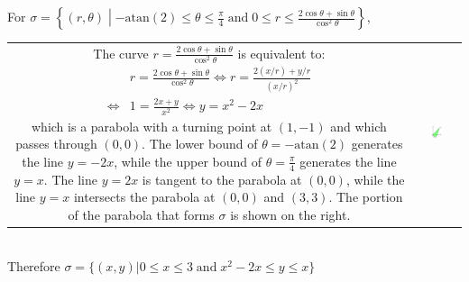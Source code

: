\documentclass{article}
\newcommand{\atan}{\text{atan}}
\newcommand{\dr}[1]{\textcolor{dark_red}{#1}}
\begin{document}
\dr{\begin{framed}
For \(\sigma = \left\{(r,\theta) \middle| -\atan(2) \leq \theta \leq \frac{\pi}{4} \;\text{and}\; 0 \leq r \leq \frac{2\cos\theta + \sin\theta}{\cos^2\theta}\right\}\), \\
\begin{tabular}{cc}
\parbox{0.6\textwidth}{
The curve \(r = \frac{2\cos\theta + \sin\theta}{\cos^2\theta}\) is equivalent to:
\begin{align*}
& r = \frac{2\cos\theta + \sin\theta}{\cos^2\theta} 
\iff r = \frac{2(x/r) + y/r}{(x/r)^2} \\ 
\iff & 1 = \frac{2x + y}{x^2} 
\iff y = x^2 - 2x
\end{align*}
which is a parabola with a turning point at \((1,-1)\) and which passes through \((0,0)\). The lower bound of \(\theta = -\atan(2)\) generates the line \(y = -2x\), while the upper bound of \(\theta = \frac{\pi}{4}\) generates the line \(y = x\).  The line \(y = 2x\) is tangent to the parabola at \((0,0)\), while the line \(y = x\) intersects the parabola at \((0,0)\) and \((3,3)\). The portion of the parabola that forms \(\sigma\) is shown on the right.
} & \parbox{0.4\textwidth}{
\includegraphics[width = 0.3\textwidth]{Test_bench_part_3x_images/Test_bench_part_3x_Solutions_image_10}
}
\end{tabular} \\
Therefore \(\sigma = \{(x,y) | 0 \leq x \leq 3 \;\text{and}\; x^2 - 2x \leq y \leq x\}\)
\end{framed}}
\end{document}
